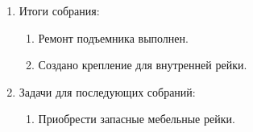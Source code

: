 \begin{enumerate}
\begin{enumerate}
    \end{enumerate}
    
	\item Итоги собрания: 
	\begin{enumerate}
	  \item Ремонт подъемника выполнен.
	  
      \item Создано крепление для внутренней рейки.
      
    \end{enumerate}
    
	\item Задачи для последующих собраний:
	\begin{enumerate}
	  \item Приобрести запасные мебельные рейки.
	  
    \end{enumerate}     
\end{enumerate}
\fillpage
